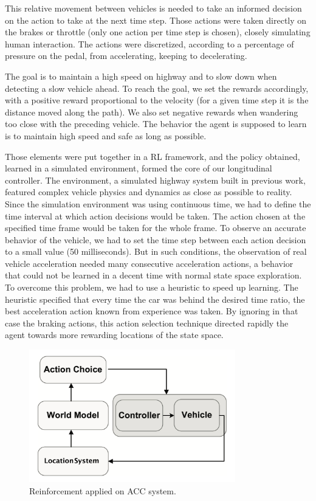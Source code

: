This relative movement between vehicles is needed to take an informed decision on the action to take at the next time step. Those actions were taken directly on the brakes or throttle (only one action per time step is chosen), closely simulating human interaction. The actions were discretized, according to a percentage of pressure on the pedal, from accelerating, keeping to decelerating.

The goal is to maintain a high speed on highway and to slow down when detecting a slow vehicle ahead. To reach the goal, we set the rewards accordingly, with a positive reward proportional to the velocity (for a given time step it is the distance moved along the path). We also set negative rewards when wandering too close  with the preceding vehicle. The behavior the agent is supposed to learn is to maintain high speed and safe as long as possible.

Those elements were put together in a RL framework, and the policy obtained, learned in a simulated environment, formed the core of our longitudinal controller. The environment, a simulated highway system built in previous work, featured complex vehicle physics and dynamics as close as possible to reality. Since the simulation environment was using continuous time, we had to define the time interval at which action decisions would be taken. The action chosen at the specified time frame would be taken for the whole frame. To observe an accurate behavior of the vehicle, we had to set the time step between each action decision to a small value (50 milliseconds). But in such conditions, the observation of real vehicle acceleration needed many consecutive acceleration actions, a behavior that could not be learned in a decent time with normal state space exploration. To overcome this problem, we had to use a heuristic to speed up learning. The heuristic specified that every time the car was behind the desired time ratio, the best acceleration action known from experience was taken. By ignoring in that case the braking actions, this action selection technique directed rapidly the agent towards more rewarding locations of the state space.

\begin{figure}[h]
\centering
\includegraphics[width=0.8\textwidth]{figs/ch4/acc-drl}
\caption{Reinforcement applied on ACC system.}
\label{fig:acc-rl}
\end{figure}

